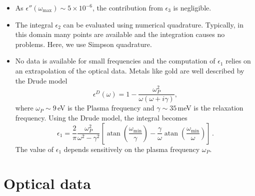 \documentclass[twocolumn,superscriptaddress,pre]{revtex4-1}
\DeclareMathOperator{\atan}{atan}
\begin{document}
\begin{itemize}
\item As $\epsilon''(\omega_\mathrm{max}) \sim 5\times10^{-6}$, the contribution
from $\epsilon_3$ is negligible.
\item The integral $\epsilon_2$ can be evaluated using numerical quadrature.
Typically, in this domain many points are available and the integration causes
no problems. Here, we use Simpson quadrature.
\item No data is available for small frequencies and the computation of
$\epsilon_1$ relies on an extrapolation of the optical data. Metals like
gold are well described by the Drude model
\begin{equation}
\label{eq:drude}
\epsilon^D(\omega) = 1 - \frac{\omega_P^2}{\omega(\omega+i\gamma)},
\end{equation}
where $\omega_P \sim 9\,$eV is the Plasma frequency and $\gamma \sim 35\,$meV
is the relaxation frequency. Using the Drude model, the integral becomes
\begin{equation}
\epsilon_1 = \frac{2}{\pi} \frac{\omega_P^2}{\omega^2-\gamma^2} \left[ \atan\left(\frac{\omega_\mathrm{min}}{\gamma}\right) - \frac{\gamma}{\omega} \atan\left(\frac{\omega_\mathrm{min}}{\omega}\right)\right] \,.
\end{equation}
The value of $\epsilon_1$ depends sensitively on the plasma frequency
$\omega_P$.
\end{itemize}

\section{Optical data}
\end{document}
